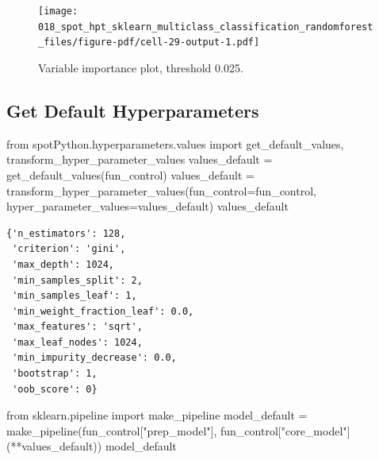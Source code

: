 \documentclass[
  letterpaper,
  DIV=11,
  numbers=noendperiod]{scrreprt}
\newenvironment{Shaded}{\begin{snugshade}}{\end{snugshade}}
\newcommand{\ImportTok}[1]{\textcolor[rgb]{0.00,0.46,0.62}{#1}}
\newcommand{\NormalTok}[1]{\textcolor[rgb]{0.00,0.23,0.31}{#1}}
\newcommand{\OperatorTok}[1]{\textcolor[rgb]{0.37,0.37,0.37}{#1}}
\newcommand{\StringTok}[1]{\textcolor[rgb]{0.13,0.47,0.30}{#1}}
\begin{document}
\begin{figure}[H]

{\centering \texttt{[image: 018\_spot\_hpt\_sklearn\_multiclass\_classification\_randomforest\_files/figure-pdf/cell-29-output-1.pdf]}

}

\caption{Variable importance plot, threshold 0.025.}

\end{figure}

\hypertarget{get-default-hyperparameters-1}{%
\subsection{Get Default
Hyperparameters}\label{get-default-hyperparameters-1}}

\begin{Shaded}
\begin{Highlighting}[]
\ImportTok{from}\NormalTok{ spotPython.hyperparameters.values }\ImportTok{import}\NormalTok{ get\_default\_values, transform\_hyper\_parameter\_values}
\NormalTok{values\_default }\OperatorTok{=}\NormalTok{ get\_default\_values(fun\_control)}
\NormalTok{values\_default }\OperatorTok{=}\NormalTok{ transform\_hyper\_parameter\_values(fun\_control}\OperatorTok{=}\NormalTok{fun\_control, hyper\_parameter\_values}\OperatorTok{=}\NormalTok{values\_default)}
\NormalTok{values\_default}
\end{Highlighting}
\end{Shaded}

\begin{verbatim}
{'n_estimators': 128,
 'criterion': 'gini',
 'max_depth': 1024,
 'min_samples_split': 2,
 'min_samples_leaf': 1,
 'min_weight_fraction_leaf': 0.0,
 'max_features': 'sqrt',
 'max_leaf_nodes': 1024,
 'min_impurity_decrease': 0.0,
 'bootstrap': 1,
 'oob_score': 0}
\end{verbatim}

\begin{Shaded}
\begin{Highlighting}[]
\ImportTok{from}\NormalTok{ sklearn.pipeline }\ImportTok{import}\NormalTok{ make\_pipeline}
\NormalTok{model\_default }\OperatorTok{=}\NormalTok{ make\_pipeline(fun\_control[}\StringTok{"prep\_model"}\NormalTok{], fun\_control[}\StringTok{"core\_model"}\NormalTok{](}\OperatorTok{**}\NormalTok{values\_default))}
\NormalTok{model\_default}
\end{Highlighting}
\end{Shaded}
\end{document}

